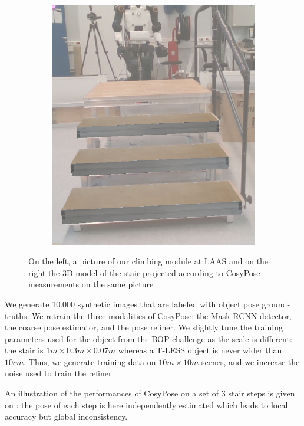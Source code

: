 \begin{figure}[h]
\begin{subfigure}[]{{.33\linewidth}}
        \includegraphics[width=\textwidth]{figures/cosyslam/0006_proj.png} 
    \end{subfigure}
    \caption{On the left, a picture of our climbing module at LAAS and on the right the 3D model of the stair projected according to CosyPose measurements on the same picture}%
    \label{fig:cosypose-ycbv}%
\end{figure}

We generate 10.000 synthetic images that are labeled with object pose ground-truths. We retrain the three modalities of CosyPose: 
the Mask-RCNN detector, the coarse pose estimator, and the pose refiner. We slightly tune the training parameters used for the object from the BOP challenge as 
the scale is different: the stair is $1m \times 0.3m \times 0.07m$ whereas a T-LESS object is never wider than $10cm$. 
Thus, we generate training data on $10m \times 10m$ scenes, and we increase the noise used to train the refiner.  

An illustration of the performances of CosyPose on a set of 3 stair steps is given on : 
the pose of each step is here independently estimated which leads to local accuracy but global inconsistency. 